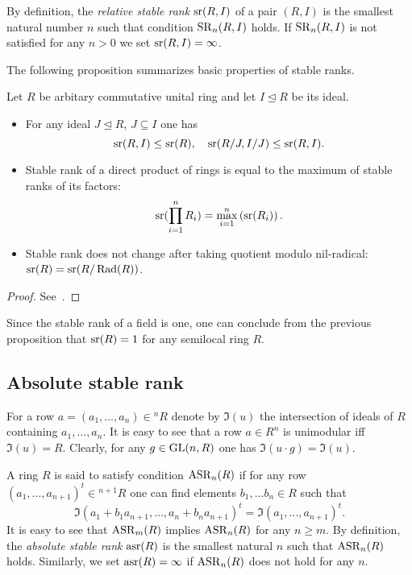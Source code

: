 By definition, the {\it relative stable rank} $\operatorname{sr}(R, I)$ of a pair $(R, I)$ is the smallest natural number $n$ such that condition $\operatorname{SR}_n(R, I)$ holds.
If $\operatorname{SR}_n(R, I)$ is not satisfied for any $n>0$ we set $\operatorname{sr}(R, I)=\infty$.

The following proposition summarizes basic properties of stable ranks.
\begin{prop} \label{prop:sr_properties} Let $R$ be arbitary commutative unital ring and let $I\trianglelefteq R$ be its ideal.
 \begin{itemize}
  \item For any ideal $J\trianglelefteq R$, $J\subseteq I$ one has $$\operatorname{sr}(R, I)\leq\operatorname{sr}(R),\quad \operatorname{sr}(R/J, I/J)\leq \operatorname{sr}(R, I).$$
  \item Stable rank of a direct product of rings is equal to the maximum of stable ranks of its factors: $$\operatorname{sr}(\prod\limits_{i=1}^n R_i) = \max\limits_{i=1}^n\left(\operatorname{sr}(R_i)\right).$$
  \item Stable rank does not change after taking quotient modulo nil-radical: $\operatorname{sr}(R)=\operatorname{sr}(R/\operatorname{Rad}(R))$.
 \end{itemize}\end{prop} \begin{proof} See~\cite{Va71}. \end{proof}

\begin{example} Since the stable rank of a field is one, one can conclude from the previous proposition that $\operatorname{sr}(R)=1$ for any semilocal ring $R$. \end{example}

\subsection{Absolute stable rank}
For a row $a=(a_1,\ldots, a_n) \in {}^n\!R$ denote by $\mathfrak{I}(u)$ the intersection of ideals of $R$ containing $a_1, \ldots, a_n$.
It is easy to see that a row $a\in R^n$ is unimodular iff $\mathfrak{I}(u)=R$. 
Clearly, for any $g\in\operatorname{GL}(n, R)$ one has $\mathfrak{I}(u\cdot g)=\mathfrak{I}(u)$.

A ring $R$ is said to satisfy condition $\operatorname{ASR}_{n}(R)$ if for any row $(a_1,\ldots,a_{n+1})^t\in {}^{n+1}\!R$ 
one can find elements $b_1,\ldots b_n\in R$ such that $$\mathfrak{I}(a_1+b_1a_{n+1},\ldots,a_n+b_na_{n+1})^t= \mathfrak{I}(a_1,\ldots,a_{n+1})^t.$$
It is easy to see that $\operatorname{ASR}_m(R)$ implies $\operatorname{ASR}_n(R)$ for any $n\ge m$. 
By definition, the {\it absolute stable rank \/} $\operatorname{asr}(R)$ is the smallest natural $n$ such that $\operatorname{ASR}_n(R)$ holds.
Similarly, we set $\operatorname{asr}(R)=\infty$ if $\operatorname{ASR}_n(R)$ does not hold for any $n$. 

